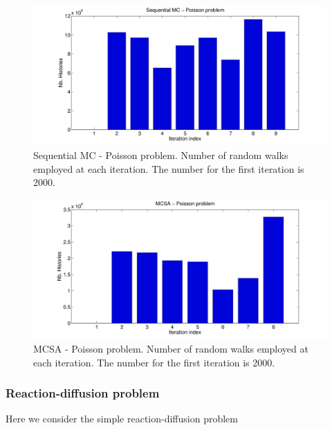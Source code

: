 \documentclass[times]{nlaauth}
\begin{document}
\begin{figure}
  \centering
    \includegraphics[width=\textwidth]{MC_graphs/SEQ_poisson}
\vspace{-0.3in}
    \caption{Sequential MC - Poisson problem. Number of random walks employed
at each iteration. The number for the first iteration is 2000.}
\label{SEQ_poisson}
\end{figure}


\begin{figure}
  \centering
    \includegraphics[width=\textwidth]{MC_graphs/MCSA_poisson}
\vspace{-0.3in}
      \caption{MCSA - Poisson problem. Number of random walks employed at each
iteration. The number for the first iteration is 2000.}
\label{MCSA_poisson}
\end{figure}



\subsubsection{Reaction-diffusion problem}

Here we consider the simple reaction-diffusion problem
\end{document}
